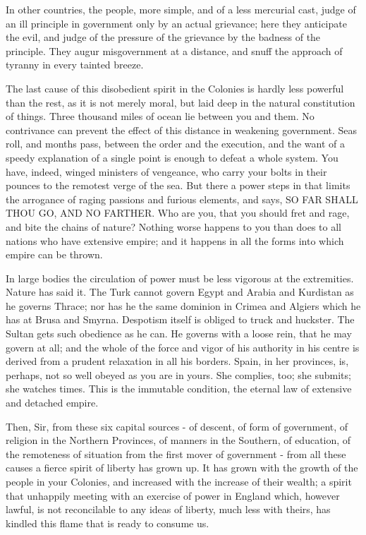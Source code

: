 In other countries, the people, more simple, and of a less mercurial cast, judge of an ill principle in government only by an actual grievance; here they anticipate the evil, and judge of the pressure of the grievance by the badness of the principle. They augur misgovernment at a distance, and snuff the approach of tyranny in every tainted breeze.\par

The last cause of this disobedient spirit in the Colonies is hardly less powerful than the rest, as it is not merely moral, but laid deep in the natural constitution of things. Three thousand miles of ocean lie between you and them. No contrivance can prevent the effect of this distance in weakening government. Seas roll, and months pass, between the order and the execution, and the want of a speedy explanation of a single point is enough to defeat a whole system. You have, indeed, winged ministers of vengeance, who carry your bolts in their pounces to the remotest verge of the sea. But there a power steps in that limits the arrogance of raging passions and furious elements, and says, SO FAR SHALL THOU GO, AND NO FARTHER. Who are you, that you should fret and rage, and bite the chains of nature? Nothing worse happens to you than does to all nations who have extensive empire; and it happens in all the forms into which empire can be thrown.\par

In large bodies the circulation of power must be less vigorous at the extremities. Nature has said it. The Turk cannot govern Egypt and Arabia and Kurdistan as he governs Thrace; nor has he the same dominion in Crimea and Algiers which he has at Brusa and Smyrna. Despotism itself is obliged to truck and huckster. The Sultan gets such obedience as he can. He governs with a loose rein, that he may govern at all; and the whole of the force and vigor of his authority in his centre is derived from a prudent relaxation in all his borders. Spain, in her provinces, is, perhaps, not so well obeyed as you are in yours. She complies, too; she submits; she watches times. This is the immutable condition, the eternal law of extensive and detached empire.\par

Then, Sir, from these six capital sources - of descent, of form of government, of religion in the Northern Provinces, of manners in the Southern, of education, of the remoteness of situation from the first mover of government - from all these causes a fierce spirit of liberty has grown up. It has grown with the growth of the people in your Colonies, and increased with the increase of their wealth; a spirit that unhappily meeting with an exercise of power in England which, however lawful, is not reconcilable to any ideas of liberty, much less with theirs, has kindled this flame that is ready to consume us.\par

